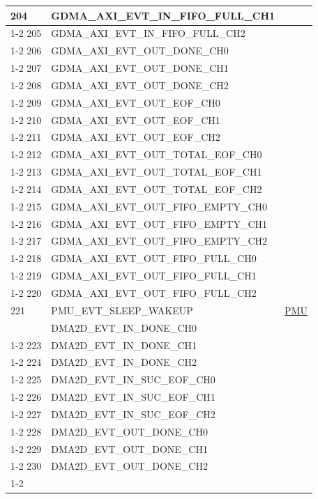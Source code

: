 \documentclass[main\_\_EN.tex]{subfiles}
\begin{document}
\begin{longtable}{ | l | l | l | }
204 & GDMA\_AXI\_EVT\_IN\_FIFO\_FULL\_CH1   & \\ \cline{1-2}
205 & GDMA\_AXI\_EVT\_IN\_FIFO\_FULL\_CH2   & \\ \cline{1-2}
206 & GDMA\_AXI\_EVT\_OUT\_DONE\_CH0 & \\ \cline{1-2}
207 & GDMA\_AXI\_EVT\_OUT\_DONE\_CH1 & \\ \cline{1-2}
208 & GDMA\_AXI\_EVT\_OUT\_DONE\_CH2 & \\ \cline{1-2}
209 & GDMA\_AXI\_EVT\_OUT\_EOF\_CH0  & \\ \cline{1-2}
210 & GDMA\_AXI\_EVT\_OUT\_EOF\_CH1  & \\ \cline{1-2}
211 & GDMA\_AXI\_EVT\_OUT\_EOF\_CH2  & \\ \cline{1-2}
212 & GDMA\_AXI\_EVT\_OUT\_TOTAL\_EOF\_CH0  & \\ \cline{1-2}
213 & GDMA\_AXI\_EVT\_OUT\_TOTAL\_EOF\_CH1  & \\ \cline{1-2}
214 & GDMA\_AXI\_EVT\_OUT\_TOTAL\_EOF\_CH2  & \\ \cline{1-2}
215 & GDMA\_AXI\_EVT\_OUT\_FIFO\_EMPTY\_CH0 & \\ \cline{1-2}
216 & GDMA\_AXI\_EVT\_OUT\_FIFO\_EMPTY\_CH1 & \\ \cline{1-2}
217 & GDMA\_AXI\_EVT\_OUT\_FIFO\_EMPTY\_CH2 & \\ \cline{1-2}
218 & GDMA\_AXI\_EVT\_OUT\_FIFO\_FULL\_CH0  & \\ \cline{1-2}
219 & GDMA\_AXI\_EVT\_OUT\_FIFO\_FULL\_CH1  & \\ \cline{1-2}
220 & GDMA\_AXI\_EVT\_OUT\_FIFO\_FULL\_CH2  & \\ \hline
221 & PMU\_EVT\_SLEEP\_WAKEUP   & \hyperref[mod:lowpowm]{PMU} \\ \hline
\iftagged{ESP32-P4-latest}{%
222 & DMA2D\_EVT\_IN\_DONE\_CH0  & \nameref{mod:2ddma} \\ \cline{1-2}
223 & DMA2D\_EVT\_IN\_DONE\_CH1  & \\ \cline{1-2}
224 & DMA2D\_EVT\_IN\_DONE\_CH2  & \\ \cline{1-2}
225 & DMA2D\_EVT\_IN\_SUC\_EOF\_CH0  & \\ \cline{1-2}
226 & DMA2D\_EVT\_IN\_SUC\_EOF\_CH1  & \\ \cline{1-2}
227 & DMA2D\_EVT\_IN\_SUC\_EOF\_CH2  & \\ \cline{1-2}
228 & DMA2D\_EVT\_OUT\_DONE\_CH0  & \\ \cline{1-2}
229 & DMA2D\_EVT\_OUT\_DONE\_CH1  & \\ \cline{1-2}
230 & DMA2D\_EVT\_OUT\_DONE\_CH2  & \\ \cline{1-2}
}
\end{longtable}
\end{document}

